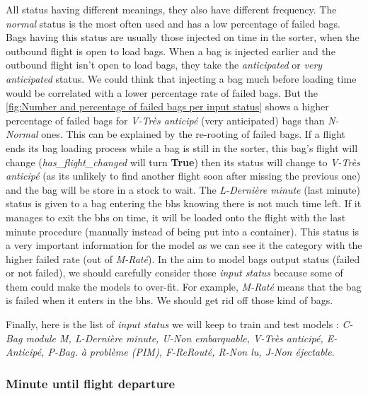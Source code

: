 \documentclass[12pt]{article}
\begin{document}
All status having different meanings, they also have different frequency. The \textit{normal} status is the most often used and has a low percentage of failed bags. Bags having this status are usually those injected on time in the sorter, when the outbound flight is open to load bags. When a bag is injected earlier and the outbound flight isn't open to load bags, they take the \textit{anticipated} or \textit{very anticipated} status. We could think that injecting a bag much before loading time would be correlated with a lower percentage rate of failed bags. But the \autoref{fig:Number and percentage of failed bags per input status} shows a higher percentage of failed bags for \textit{V-Très anticipé} (very anticipated) bags than \textit{N-Normal} ones. This can be explained by the re-rooting of failed bags. If a flight ends its bag loading process while a bag is still in the sorter, this bag's flight will change (\textit{has\_flight\_changed} will turn \textbf{True}) then its status will change to \textit{V-Très anticipé} (as its unlikely to find another flight soon after missing the previous one) and the bag will be store in a stock to wait.
\noindent The \textit{L-Dernière minute} (last minute) status is given to a bag entering the \acrshort{bhs} knowing there is not much time left. If it manages to exit the \acrshort{bhs} on time, it will be loaded onto the flight with the last minute procedure (manually instead of being put into a container). This status is a very important information for the model as we can see it the category with the higher failed rate (out of \textit{M-Raté}).
\noindent In the aim to model bags output status (failed or not failed), we should carefully consider those \textit{input status} because some of them could make the models to over-fit. For example, \textit{M-Raté} means that the bag is failed when it enters in the \acrshort{bhs}. We should get rid off those kind of bags. 


Finally, here is the list of \textit{input status} we will keep to train and test models : \textit{C-Bag module M, L-Dernière minute, U-Non embarquable, V-Très anticipé, E-Anticipé, P-Bag. à problème (PIM), F-ReRouté, R-Non lu, J-Non éjectable}.

\subsubsection{Minute until flight departure}
\end{document}

